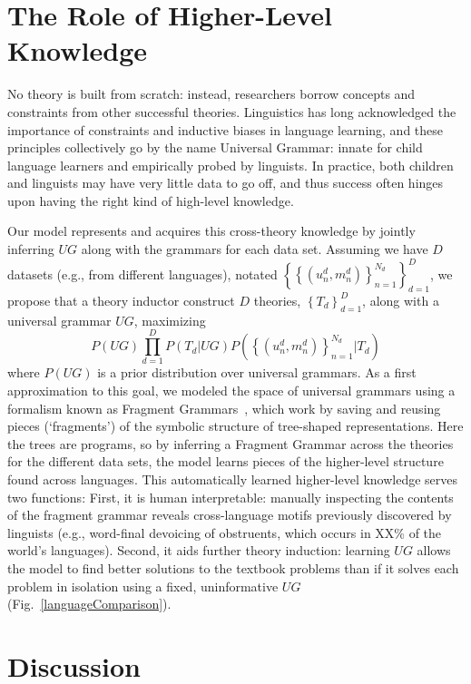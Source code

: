 \documentclass[12pt]{article}
\begin{document}
\section*{The Role of Higher-Level Knowledge}

No theory is built from scratch: instead, researchers borrow concepts
and constraints from other successful theories.  Linguistics has long
acknowledged the importance of constraints and inductive biases in
language learning, and these principles collectively go by the name
Universal Grammar: innate for child language learners and 
empirically probed by linguists.
In practice,
both children and linguists
may have very little data to go off,
and thus success often hinges upon
having the right kind of high-level knowledge.

Our model represents and acquires this cross-theory knowledge
by jointly inferring $UG$ along with the grammars for each data set.
Assuming we have $D$ datasets (e.g., from different languages),
notated $\left\{\left\{(u_n^d,m_n^d) \right\}_{n = 1}^{N_d} \right\}_{d = 1}^D$,
we propose that a
theory inductor construct $D$ theories, $\left\{T_d \right\}_{d = 1}^D$,
along with a universal grammar $UG$, maximizing
$$
P(UG)\prod_{d = 1}^D P(T_d|UG)P(\left\{(u_n^d,m_n^d) \right\}_{n = 1}^{N_d}|T_d)
$$
where $P(UG)$ is a prior distribution over universal grammars.
As a first approximation to this goal,
we modeled the space of universal grammars
using a formalism known as Fragment Grammars~\cite{tim},
which work by saving and reusing pieces (`fragments')
of the symbolic structure of tree-shaped representations.
Here the trees are programs,
so by inferring a Fragment Grammar across the theories for the different data sets,
the model learns
pieces of the higher-level structure
found across languages.
This automatically learned higher-level knowledge
serves two functions:
First, it is human interpretable:
manually inspecting the contents of the fragment grammar reveals
cross-language motifs previously discovered by linguists (e.g., word-final devoicing of obstruents,
which occurs in XX\% of the world's languages).
Second,
it aids further theory induction:
learning $UG$ allows the model to
find better solutions to the textbook problems than if it solves
each problem in isolation using a fixed,
uninformative $UG$ (Fig.~\ref{languageComparison}).



\section*{Discussion}
\end{document}
